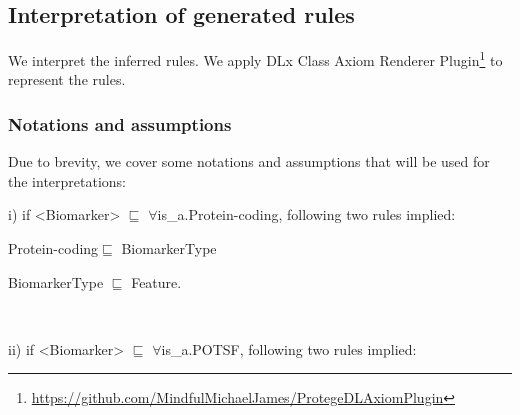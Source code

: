 \subsection{Interpretation of generated rules}
We interpret the inferred rules. We apply DLx Class Axiom Renderer Plugin\footnote{\url{https://github.com/MindfulMichaelJames/ProtegeDLAxiomPlugin}} to represent the rules.   

\subsubsection{Notations and assumptions}
Due to brevity, we cover some notations and assumptions that will be used for the interpretations:

\noindent i) if <Biomarker> $\sqsubseteq$ $\forall$is\_a.Protein-coding, following two rules implied:\\

\vspace{-6mm}
\begin{itemize}[noitemsep]
\scriptsize{
    \item Protein-coding$\sqsubseteq$ BiomarkerType
    \item BiomarkerType $\sqsubseteq$ Feature.}\\
\end{itemize}
\vspace{-6mm}

\noindent ii) if <Biomarker> $\sqsubseteq$ $\forall$is\_a.POTSF, following two rules implied:\\

